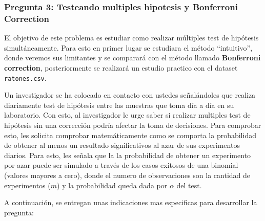 \documentclass[]{article}
\begin{document}
\hypertarget{pregunta-3-testeando-multiples-hipotesis-y-bonferroni-correction}{%
\subsubsection{Pregunta 3: Testeando multiples hipotesis y Bonferroni
Correction}\label{pregunta-3-testeando-multiples-hipotesis-y-bonferroni-correction}}

El objetivo de este problema es estudiar como realizar múltiples test de
hipótesis simultáneamente. Para esto en primer lugar se estudiara el
método ``intuitivo'', donde veremos sus limitantes y se comparará con el
método llamado \textbf{Bonferroni correction}, posteriormente se
realizará un estudio practico con el dataset \texttt{ratones.csv}.

Un investigador se ha colocado en contacto con ustedes señalándoles que
realiza diariamente test de hipótesis entre las muestras que toma día a
día en su laboratorio. Con esto, al investigador le urge saber si
realizar multiples test de hipótesis sin una corrección podría afectar
la toma de decisiones. Para comprobar esto, les solicita comprobar
matemáticamente como se comporta la probabilidad de obtener al menos un
resultado significativos al azar de sus experimentos diarios. Para esto,
les señala que la la probabilidad de obtener un experimento por azar
puede ser simulado a través de los casos exitosos de una binomial
(valores mayores a cero), donde el numero de observaciones son la
cantidad de experimentos (\(m\)) y la probabilidad queda dada por
\(\alpha\) del test.

A continuación, se entregan unas indicaciones mas especificas para
desarrollar la pregunta:
\end{document}
